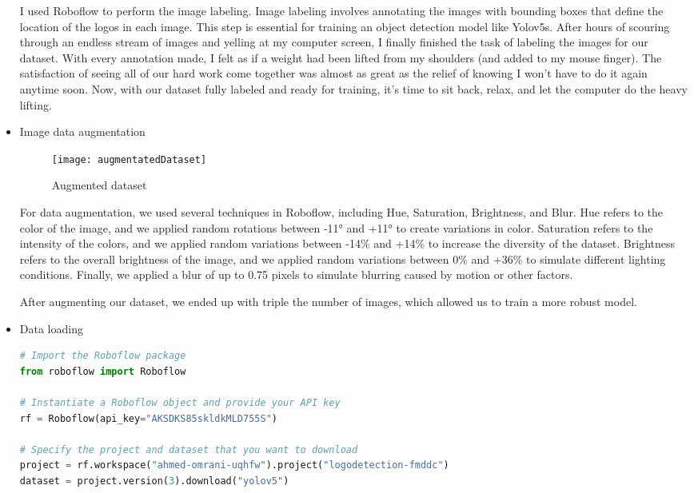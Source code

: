 \begin{itemize}
\begin{figure}[ht]
\end{figure}
\FloatBarrier
I used Roboflow to perform the image labeling. Image labeling involves annotating the images with bounding boxes that define the location of the logos in each image. This step is essential for training an object detection model like Yolov5s.
After hours of scouring through an endless stream of images and yelling at my computer screen, I finally finished the task of labeling the images for our dataset. With every annotation made, I felt as if a weight had been lifted from my shoulders (and added to my mouse finger). The satisfaction of seeing all of our hard work come together was almost as great as the relief of knowing I won't have to do it again anytime soon. Now, with our dataset fully labeled and ready for training, it's time to sit back, relax, and let the computer do the heavy lifting.
\item{Image data augmentation}
\FloatBarrier
\begin{figure}
    \centering
    \texttt{[image: augmentatedDataset]}
    \caption{Augmented dataset}
    \label{fig:Augmented dataset}
\end{figure}
\FloatBarrier
For data augmentation, we used several techniques in Roboflow, including Hue, Saturation, Brightness, and Blur. Hue refers to the color of the image, and we applied random rotations between -11° and +11° to create variations in color. Saturation refers to the intensity of the colors, and we applied random variations between -14\% and +14\% to increase the diversity of the dataset. Brightness refers to the overall brightness of the image, and we applied random variations between 0\% and +36\% to simulate different lighting conditions. Finally, we applied a blur of up to 0.75 pixels to simulate blurring caused by motion or other factors.

After augmenting our dataset, we ended up with triple the number of images, which allowed us to train a more robust model.


\item{Data loading}
\begin{lstlisting}[language=Python]
# Import the Roboflow package
from roboflow import Roboflow

# Instantiate a Roboflow object and provide your API key
rf = Roboflow(api_key="AKSDKS85skldkMLD755S")

# Specify the project and dataset that you want to download
project = rf.workspace("ahmed-omrani-uqhfw").project("logodetection-fmddc")
dataset = project.version(3).download("yolov5")



\end{lstlisting}
\end{itemize}
